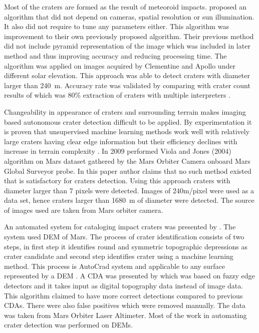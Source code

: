 \documentclass[11pt]{article}
\begin{document}
Most of the craters are formed as the result of meteoroid impacts. \cite{sawabe_2006} proposed an algorithm that did not depend on cameras, spatial resolution or sun illumination. It also did not require to tune any parameters either. This algorithm was improvement to their own previously proposed algorithm. Their previous method did not include pyramid representation of the image which was included in later method and thus improving accuracy and reducing processing time. The algorithm was applied on images acquired by Clementine and Apollo under different solar elevation. This approach was able to detect craters with diameter larger than \SI{240}{m}. Accuracy rate was validated by comparing with crater count results of \cite{neukum1975cratering} which was 80\% extraction of craters with multiple interpreters \cite{sawabe_2006}. 

Changeability in appearance of craters and surrounding terrain makes imaging based autonomous crater detection difficult to be applied. By experimentation it is proven that unsupervised machine learning methods work well with relatively large craters having clear edge information but their efficiency declines with increase in terrain complexity \cite{meng2009method}. In 2009 \cite{martins2009crater} performed Viola and Jones (2004) algorithm on Mars dataset gathered by the Mars Orbiter Camera onboard Mars Global Surveyor probe. In this paper author claims that no such method existed that is satisfactory for craters detection. Using this approach craters with diameter larger than 7 pixels were detected. Images of 240m/pixel were used as a data set, hence craters larger than \SI{1680}{m} of diameter were detected. The source of images used are taken from Mars orbiter camera.

An automated system for cataloging impact craters was presented by \cite{stepinski2009machine}. The system used DEM of Mars. The process of crater identification consists of two steps, in first step it identifies round and symmetric topographic depressions as crater candidate and second step identifies crater using a machine learning method. This process is AutoCrad system and applicable to any surface represented by a DEM \cite{stepinski2009machine}. A CDA was presented by \cite{salamuniccar2010method} which was based on fuzzy edge detectors and it takes input as digital topography data instead of image data. This algorithm claimed to have more correct detections compared to previous CDAs. There were also false positives which were removed manually. The data was taken from Mars Orbiter Laser Altimeter. Most of the work in automating crater detection was performed on DEMs.
\end{document}
